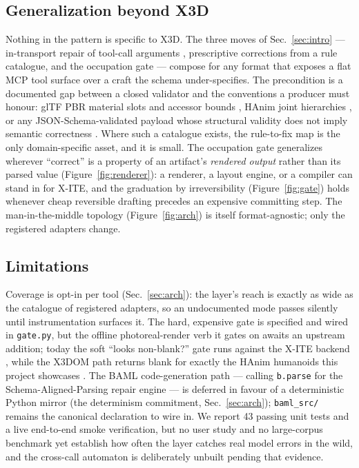 \documentclass[sigconf,nonacm,screen,anonymous]{acmart}
\begin{document}
\subsection{Generalization beyond X3D}
Nothing in the pattern is specific to X3D. The three moves of Sec.~\ref{sec:intro} --- in-transport repair of tool-call arguments \cite{postel,baml}, prescriptive corrections from a rule catalogue, and the occupation gate --- compose for any format that exposes a flat MCP tool surface \cite{mcp} over a craft the schema under-specifies. The precondition is a documented gap between a closed validator and the conventions a producer must honour: glTF PBR material slots and accessor bounds \cite{gltf}, HAnim joint hierarchies \cite{hanim}, or any JSON-Schema-validated payload whose structural validity does not imply semantic correctness \cite{jsonschema}. Where such a catalogue exists, the rule-to-fix map is the only domain-specific asset, and it is small. The occupation gate generalizes wherever ``correct'' is a property of an artifact's \emph{rendered output} rather than its parsed value (Figure~\ref{fig:renderer}): a renderer, a layout engine, or a compiler can stand in for X\nobreakdash-ITE, and the graduation by irreversibility (Figure~\ref{fig:gate}) holds whenever cheap reversible drafting precedes an expensive committing step. The man-in-the-middle topology (Figure~\ref{fig:arch}) is itself format-agnostic; only the registered adapters change.

\subsection{Limitations}
Coverage is opt-in per tool (Sec.~\ref{sec:arch}): the layer's reach is exactly as wide as the catalogue of registered adapters, so an undocumented mode passes silently until instrumentation surfaces it. The hard, expensive gate is specified and wired in \texttt{gate.py}, but the offline photoreal-render verb it gates on awaits an upstream addition; today the soft ``looks non-blank?'' gate runs against the X\nobreakdash-ITE backend \cite{xite}, while the X3DOM path returns blank for exactly the HAnim humanoids this project showcases \cite{x3dom}. The BAML code-generation path --- calling \texttt{b.parse} for the Schema-Aligned-Parsing repair engine --- is deferred in favour of a deterministic Python mirror (the determinism commitment, Sec.~\ref{sec:arch}); \texttt{baml\_src/} remains the canonical declaration to wire in. We report 43 passing unit tests and a live end-to-end smoke verification, but no user study and no large-corpus benchmark yet establish how often the layer catches real model errors in the wild, and the cross-call automaton is deliberately unbuilt pending that evidence.
\end{document}
